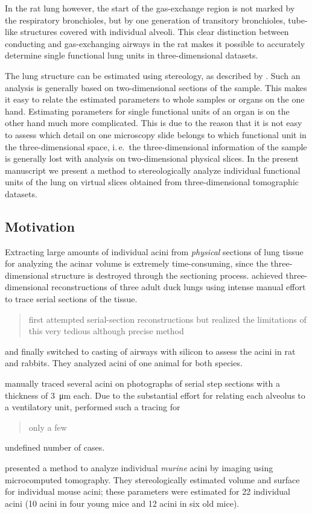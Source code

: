 \documentclass[a4paper,DIV=calc,abstract,english]{scrartcl}
\newcommand{\ie}{i.\,e.\ }
\begin{document}
In the rat lung however, the start of the gas-exchange region is not marked by the respiratory bronchioles, but by one generation of transitory bronchioles, tube-like structures covered with individual alveoli.
This clear distinction between conducting and gas-exchanging airways in the rat makes it possible to accurately determine single functional lung units in three-dimensional datasets.

The lung structure can be estimated using stereology, as described by \citet{Hsia2010}.
Such an analysis is generally based on two-dimensional sections of the sample.
This makes it easy to relate the estimated parameters to whole samples or organs on the one hand.
Estimating parameters for single functional units of an organ is on the other hand much more complicated.
This is due to the reason that it is not easy to assess which detail on one microscopy slide belongs to which functional unit in the three-dimensional space, \ie the three-dimensional information of the sample is generally lost with analysis on two-dimensional physical slices.
In the present manuscript we present a method to stereologically analyze individual functional units of the lung on virtual slices obtained from three-dimensional tomographic datasets.

\subsection{Motivation}
Extracting large amounts of individual acini from \emph{physical} sections of lung tissue for analyzing the acinar volume is extremely time-consuming, since the three-dimensional structure is destroyed through the sectioning process.
\citet{Woodward2005} achieved three-dimensional reconstructions of three adult duck lungs using intense manual effort to trace serial sections of the tissue.
\citet{Rodriguez1987} \blockquote{first attempted serial-section reconstructions but realized the limitations of this very tedious although precise method} and finally switched to casting of airways with silicon to assess the acini in rat and rabbits.
They analyzed acini of one animal for both species.

\citet{Mercer1987a} manually traced several acini on photographs of serial step sections with a thickness of \SI{3}{\micro\meter} each.
Due to the substantial effort for relating each alveolus to a ventilatory unit, \citeauthor{Mercer1987a} performed such a tracing for \blockquote{only a few} undefined number of cases.

\citet{Vasilescu2012} presented a method to analyze individual \emph{murine} acini by imaging using microcomputed tomography. They stereologically estimated volume and surface for individual mouse acini; these parameters were estimated for 22 individual acini (10 acini in four young mice and 12 acini in six old mice).
\end{document}
